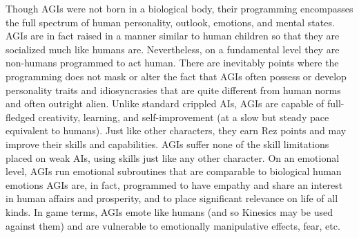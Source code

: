 Though AGIs were not born in a biological body, their programming encompasses the full spectrum of human personality, outlook, emotions, and mental states. AGIs are in fact raised in a manner similar to human children so that they are socialized much like humans are. Nevertheless, on a fundamental level they are non-humans programmed to act human. There are inevitably points where the programming does not mask or alter the fact that AGIs often possess or develop personality traits and idiosyncrasies that are quite different from human norms and often outright alien. Unlike standard crippled AIs, AGIs are capable of full-fledged creativity, learning, and self-improvement (at a slow but steady pace equivalent to humans). Just like other characters, they earn Rez points and may improve their skills and capabilities. AGIs suffer none of the skill limitations placed on weak AIs, using skills just like any other character. On an emotional level, AGIs run emotional subroutines that are comparable to biological human emotions AGIs are, in fact, programmed to have empathy and share an interest in human affairs and prosperity, and to place significant relevance on life of all kinds. In game terms, AGIs emote like humans (and so Kinesics may be used against them) and are vulnerable to emotionally manipulative effects, fear, etc. 









